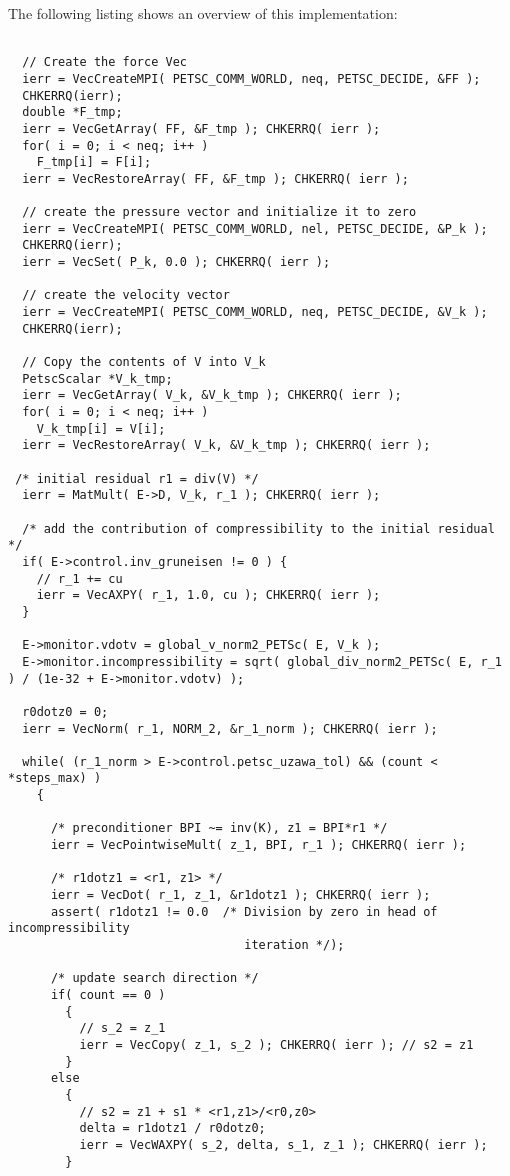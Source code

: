 \documentclass[10pt,letterpaper]{article}
\begin{document}
The following listing shows an overview of this implementation:
\begin{lstlisting}[frame=tb,mathescape,caption=Uzawa Algorithm]

  // Create the force Vec
  ierr = VecCreateMPI( PETSC_COMM_WORLD, neq, PETSC_DECIDE, &FF ); 
  CHKERRQ(ierr);
  double *F_tmp;
  ierr = VecGetArray( FF, &F_tmp ); CHKERRQ( ierr );
  for( i = 0; i < neq; i++ )
    F_tmp[i] = F[i];
  ierr = VecRestoreArray( FF, &F_tmp ); CHKERRQ( ierr );

  // create the pressure vector and initialize it to zero
  ierr = VecCreateMPI( PETSC_COMM_WORLD, nel, PETSC_DECIDE, &P_k ); 
  CHKERRQ(ierr);
  ierr = VecSet( P_k, 0.0 ); CHKERRQ( ierr );

  // create the velocity vector
  ierr = VecCreateMPI( PETSC_COMM_WORLD, neq, PETSC_DECIDE, &V_k ); 
  CHKERRQ(ierr);

  // Copy the contents of V into V_k
  PetscScalar *V_k_tmp;
  ierr = VecGetArray( V_k, &V_k_tmp ); CHKERRQ( ierr );
  for( i = 0; i < neq; i++ )
    V_k_tmp[i] = V[i];
  ierr = VecRestoreArray( V_k, &V_k_tmp ); CHKERRQ( ierr );
   
 /* initial residual r1 = div(V) */
  ierr = MatMult( E->D, V_k, r_1 ); CHKERRQ( ierr );

  /* add the contribution of compressibility to the initial residual */
  if( E->control.inv_gruneisen != 0 ) {
    // r_1 += cu
    ierr = VecAXPY( r_1, 1.0, cu ); CHKERRQ( ierr );
  }

  E->monitor.vdotv = global_v_norm2_PETSc( E, V_k );
  E->monitor.incompressibility = sqrt( global_div_norm2_PETSc( E, r_1 ) / (1e-32 + E->monitor.vdotv) ); 

  r0dotz0 = 0;
  ierr = VecNorm( r_1, NORM_2, &r_1_norm ); CHKERRQ( ierr );

  while( (r_1_norm > E->control.petsc_uzawa_tol) && (count < *steps_max) )
    {
      
      /* preconditioner BPI ~= inv(K), z1 = BPI*r1 */
      ierr = VecPointwiseMult( z_1, BPI, r_1 ); CHKERRQ( ierr );

      /* r1dotz1 = <r1, z1> */
      ierr = VecDot( r_1, z_1, &r1dotz1 ); CHKERRQ( ierr );
      assert( r1dotz1 != 0.0  /* Division by zero in head of incompressibility
                                 iteration */);

      /* update search direction */
      if( count == 0 )
	    {
	      // s_2 = z_1
	      ierr = VecCopy( z_1, s_2 ); CHKERRQ( ierr ); // s2 = z1
	    }
      else
	    {
	      // s2 = z1 + s1 * <r1,z1>/<r0,z0>
	      delta = r1dotz1 / r0dotz0;
	      ierr = VecWAXPY( s_2, delta, s_1, z_1 ); CHKERRQ( ierr );
	    }


\end{lstlisting}
\end{document}
